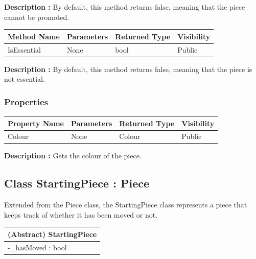 \documentclass[12pt]{article}
\begin{document}
    \textbf{Description :} By default, this method returns false, meaning that the piece cannot be promoted.

\begin{table}[H]
    \begin{tabular}{|l|l|l|l|}
    \hline
    \rowcolor[HTML]{EFEFEF} 
    \cellcolor[HTML]{EFEFEF}\textbf{Method Name} & \textbf{Parameters}  & \textbf{Returned Type} & \textbf{Visibility} \\ \hline
    IsEssential                                  & None                 & bool                   & Public              \\ \hline
    \end{tabular}
\end{table}

    \textbf{Description :} By default, this method returns false, meaning that the piece is not essential.

\subsubsection{Properties}

\begin{table}[H]
    \begin{tabular}{|l|l|l|l|}
    \hline
    \rowcolor[HTML]{EFEFEF} 
    \cellcolor[HTML]{EFEFEF}\textbf{Property Name} & \textbf{Parameters}  & \textbf{Returned Type} & \textbf{Visibility} \\ \hline
    Colour                                         & None                 & Colour                 & Public              \\ \hline
    \end{tabular}
\end{table}

    \textbf{Description :} Gets the colour of the piece.
\newpage


\subsection{Class StartingPiece : Piece}

    Extended from the Piece class, the StartingPiece class represents a piece that keeps track of whether it has been moved or not.

\begin{table}[H]
    \begin{tabular}{|l|}
    \hline
    \cellcolor[HTML]{C0C0C0}\textbf{(Abstract) StartingPiece}            \\ \hline
    \cellcolor[HTML]{EFEFEF}-\_hasMoved : bool        \\ \hline
    \end{tabular}
\end{table}
\end{document}
